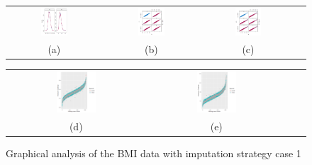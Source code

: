 	
	
	\begin{figure} [ht!]
		\centering
		\begin{tabular}{cccc}
			\includegraphics[width=0.3\textwidth]{plots/densitycase1} &
			\includegraphics[width=0.3\textwidth]{plots/scattercase1hm} &
			\includegraphics[width=0.3\textwidth]{plots/scattercase1wm} \\
			\textnormal{(a)}  & \textnormal{(b)} & \textnormal{(c)}  \\[6pt]
		\end{tabular}
		\begin{tabular}{cccc}
			\includegraphics[width=0.3\textwidth]{plots/distributioncase1hm} &
			\includegraphics[width=0.3\textwidth]{plots/distributioncase1wm} \\
			\textnormal{(d)}  & \textnormal{(e)}  \\[6pt]
		\end{tabular}
		\caption{Graphical analysis of the BMI data with imputation strategy case 1}
		\label{fig6_9}
	\end{figure}
	
